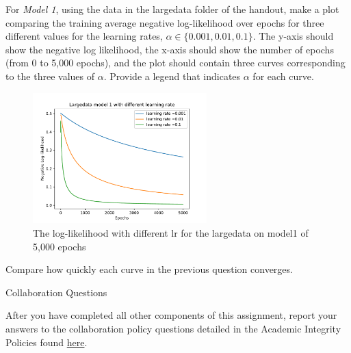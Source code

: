 \documentclass[11pt,addpoints,answers]{exam}
\begin{document}
\begin{questions}
\newpage
\question[2]
For \emph{Model 1}, using the data in the largedata folder of the handout, make a plot comparing the training average negative log-likelihood over epochs for three different values for the learning rates, $\alpha \in \{0.001, 0.01, 0.1 \}$. The y-axis should show the negative log likelihood, the x-axis should show the number of epochs (from 0 to 5,000 epochs), and the plot should contain three curves corresponding to the three values of $\alpha$. Provide a legend that indicates $\alpha$ for each curve.
        
\begin{your_solution}[height=9cm]
    \begin{figure}[H]
        \centering
        \includegraphics[width = 0.6\textwidth]{./images/l_model1_lr.pdf}
        \caption{The log-likelihood with different lr for the largedata on model1 of 5,000 epochs}
        \label{fig3}
    \end{figure}
\begin{center}
\end{center}
\end{your_solution}

\question[2] Compare how quickly each curve in the previous question converges.

\begin{your_solution}[height=8cm]
\begin{center}
\end{center}
\end{your_solution}


\newpage
\end{questions}

{\Large Collaboration Questions}

After you have completed all other components of this assignment, report your answers to the collaboration policy questions detailed in the Academic Integrity Policies found \href{http://www.cs.cmu.edu/~mgormley/courses/10601/syllabus.html#7-academic-integrity-policies}{here}.
\end{document}
